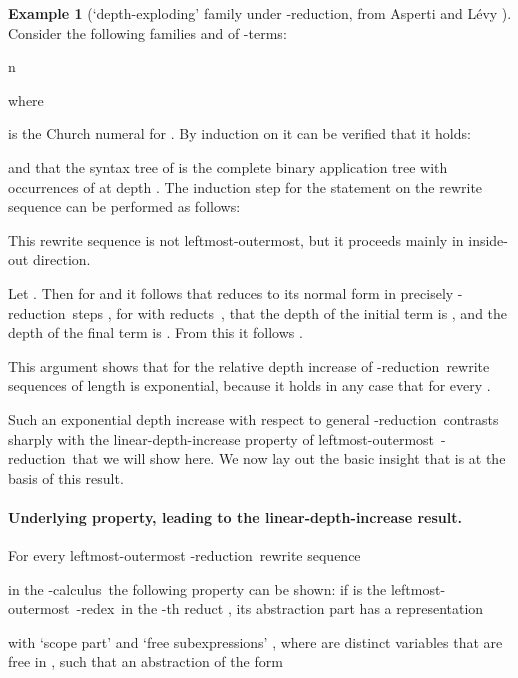 \documentclass[
submission
]{dmtcs-episciences-tampered}
\newcommand{\nb}{\nobreakdash}
\newcommand{\nat}{\mathbb{N}}
\newcommand{\lambdacalculus}{\nb-cal\-cu\-lus}
\newcommand{\lambdaterm}{\nb-term}
\newcommand{\lambdaterms}{\lambdaterm{s}}
\newcommand{\betareduction}{\nb-re\-duc\-tion}
\newcommand{\betaredex}{\nb-re\-dex}
\newcommand{\lo}{left\-most-outer\-most}
\theoremstyle{plain}
\theoremstyle{definition}
\newtheorem{example}[theorem]{Example}
\begin{document}
\begin{example}[`depth-exploding' family under \betareduction, from Asperti and L\'{e}vy \cite{aspe:levy:2013}] 
  Consider the following families  and  of \lambdaterms: 
  \begin{center}
    n\in\natn\in\nat
  \end{center}
where 
  
  is the Church numeral for .
  By induction on  it can be verified that it holds:
  \begin{center}
    
  \end{center}
  and that the syntax tree of  is the complete binary application tree 
  with  occurrences of  at depth .
  The induction step for the statement on the rewrite sequence can be performed as follows:
  
  This  rewrite sequence is not \lo, but it proceeds mainly in inside-out direction. 
  
  Let . Then for  and 
  it follows that  reduces to its normal form  in precisely  \betareduction\ steps
  ,
  for with reducts~,
  that the depth of the initial term is
  ,
  and the depth of the final term is
  .
  From this it follows
  . 
  
  This argument shows that for the relative depth increase of \betareduction\ rewrite sequences  of length 
  is exponential, because it holds in any case that
   for every .
\end{example}


\smallskip
Such an exponential depth increase with respect to general \betareduction\
contrasts sharply with the linear-depth-increase property of \lo\ \betareduction\ that we will show here.
We now lay out the basic insight that is at the basis of this result.

\paragraph{Underlying property, leading to the linear-depth-increase result.}
  For every leftmost-outermost \betareduction\ rewrite sequence 
  
  in the \lambdacalculus\ the following property can be shown:
  if  is the \lo\ \betaredex\ in the \nb-th reduct ,
  its abstraction part has a representation
    
  with `scope part'  and `free subexpressions' ,
  where  are distinct variables that are free in , 
  such that an abstraction of the form
  
\end{document}
